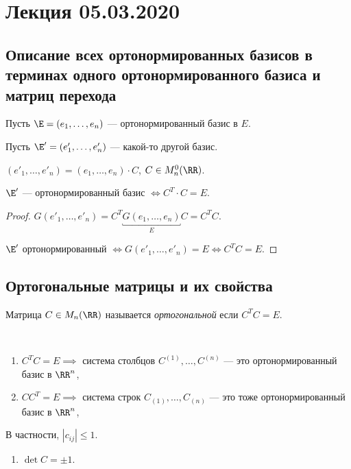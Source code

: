 \section{Лекция 05.03.2020}


\subsection{Описание всех ортонормированных базисов в терминах одного ортонормированного базиса и матриц перехода}

Пусть $\E = (e_1, \dots, e_n)$ --- ортонормированный базис в $E$.

Пусть $\E' = (e'_1, \dots, e'_n)$ --- какой-то другой базис.

$(e'_1, \dots, e'_n) = (e_1, \dots, e_n) \cdot C$, $C \in M_n^{0}(\RR)$.

\begin{proposal}
    $\E'$ --- ортонормированный базис $\iff C^{T} \cdot C = E$.
\end{proposal}

\begin{proof}
    $G(e'_1, \dots, e'_n) = C^{T} \underbracket{G(e_1, \dots, e_n)}_E C = C^{T} C$.

    $\E'$ ортонормированный $\iff G(e'_1, \dots, e'_n) = E \iff C^{T} C = E$.
\end{proof}


\subsection{Ортогональные матрицы и их свойства}

\begin{definition}
    Матрица $C \in M_n(\RR)$ называется \textit{ортогональной} если $C^{T} C = E$.
\end{definition}

\begin{comment}
    $C^{T} C = E \iff C C^{T} = E \iff C^{-1} = C^{T}$.
\end{comment}

\begin{properties}~
    \begin{enumerate}
    \item $C^{T} C = E \implies $ система столбцов $C^{(1)}, \dots, C^{(n)}$ --- это ортонормированный базис в $\RR^n$,
    \item $C C^{T} = E \implies $ система строк $C_{(1)}, \dots, C_{(n)}$ --- это тоже ортонормированный базис в $\RR^n$,
    \end{enumerate}
    В частности, $|c_{ij}| \leq 1$.
    \begin{enumerate}[resume]
    \item $\det C = \pm 1$.
    \end{enumerate}
\end{properties}

